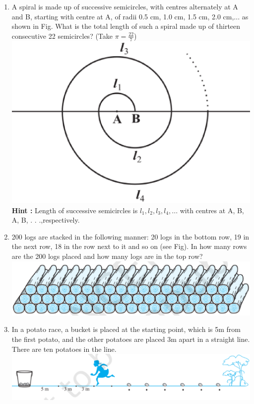\begin{enumerate}[label=\arabic*.,ref=\thesubsection.\theenumi]
\item A spiral is made up of successive semicircles, with centres alternately at A and B, starting with centre at A, of radii 0.5 cm, 1.0 cm, 1.5 cm, 2.0 cm,... as shown in Fig. What is the total length of such a spiral made up of thirteen consecutive 22 semicircles? (Take $\pi =\frac{22}{7}$)\\
\includegraphics[width=\columnwidth]{./figs/fig.eps} \\
\textbf{Hint :} Length of successive semicircles is $l_1, l_2, l_3, l_4 , . . .$ with centres at A, B, A, B, . . .,respectively.
\item 200 logs are stacked in the following manner: 20 logs in the bottom row, 19 in the next row, 18 in the row next to it and so on (see Fig). In how many rows are the 200 logs placed and how many logs are in the top row?\\
\includegraphics[width=\columnwidth]{./figs/fig1.eps} \\
\item In a potato race, a bucket is placed at the starting point, which is 5m from the first potato, and the other potatoes are placed 3m apart in a straight line. There are ten potatoes in the line.
\includegraphics[width=\columnwidth]{./figs/fig3.eps} 

\end{enumerate}
